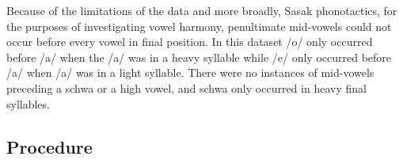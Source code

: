 \documentclass[12pt]{ouparticle}
\begin{document}
\newpage



Because of the limitations of the data and more broadly, Sasak phonotactics, for the purposes of investigating vowel harmony, penultimate mid-vowels could not occur before every vowel in final position. In this dataset /o/ only occurred before /a/ when the /a/ was in a heavy syllable while /e/ only occurred before /a/ when /a/ was in a light syllable. There were no instances of mid-vowels preceding a schwa or a high vowel, and schwa only occurred in heavy final syllables.

\subsection{Procedure}\label{sec:procedure}
\end{document}
